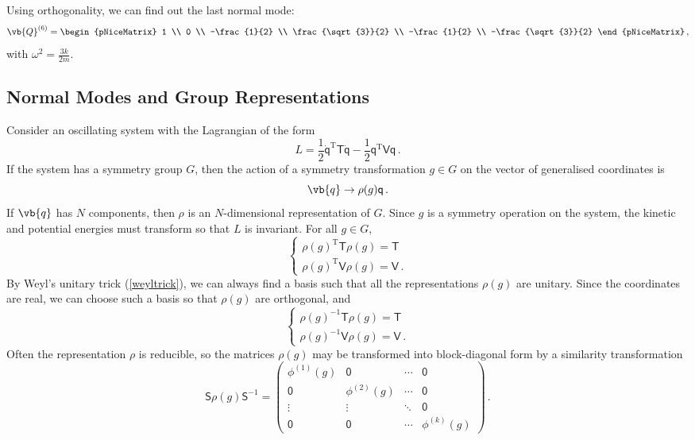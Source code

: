\documentclass{article}
\theoremstyle{plain}\theoremheaderfont{\normalfont\itshape}\theorembodyfont{\rmfamily}\theoremseparator{.}\newtheorem*{rem}{Remark}\newtheorem*{ex}{Example}\newtheorem*{proof}{Proof}\newtheorem*{altp}{Alternative proof}
\theoremstyle{plain}\theoremheaderfont{\normalfont\bfseries}\theorembodyfont{\rmfamily}\theoremseparator{.}\newtheorem{thm}{Theorem}[section]\newtheorem{lem}[thm]{Lemma}\newtheorem{prop}[thm]{Proposition}\newtheorem*{cor}{Corollary}\newtheorem{defn}[thm]{Definition}\newtheorem{clm}[thm]{Claim}\newtheorem{clminproof}{Claim}
\theoremstyle{break}\theoremheaderfont{\normalfont\itshape}\theorembodyfont{\rmfamily}\theoremseparator{.\medskip}\newtheorem*{proofskip}{Proof}\newtheorem*{exs}{Examples}\newtheorem*{rems}{Remarks}
\theoremstyle{break}\theoremheaderfont{\normalfont\bfseries}\theorembodyfont{\rmfamily}\theoremseparator{.\medskip}\newtheorem{lemskip}[thm]{Lemma}\newtheorem{defnskip}[thm]{Definition}\newtheorem{propskip}[thm]{Proposition}\newtheorem{thmskip}[thm]{Theorem}
\numberwithin{equation}{section}
\newcommand{\tp}{^\mathrm{T}}
\begin{document}
	Using orthogonality, we can find out the last normal mode:
	\[\vb{Q}^{(6)}=\begin{pNiceMatrix}
		1 \\ 0 \\ -\frac{1}{2} \\ \frac{\sqrt{3}}{2} \\ -\frac{1}{2} \\ -\frac{\sqrt{3}}{2}
	\end{pNiceMatrix}\,,\]
	with \(\omega^2=\frac{3k}{2m}\).
	\subsection{Normal Modes and Group Representations}
	Consider an oscillating system with the Lagrangian of the form
	\[L=\frac{1}{2}\dot{\mathsf{q}}\tp\mathsf{T}\dot{\mathsf{q}}-\frac{1}{2}\mathsf{q}\tp\mathsf{Vq}\,.\]
	If the system has a symmetry group \(G\), then the action of a symmetry transformation \(g\in G\) on the vector of generalised coordinates is
	\[\vb{q}\to\rho(g)\mathsf{q}\,.\]
	If \(\vb{q}\) has \(N\) components, then \(\rho\) is an \(N\)-dimensional representation of \(G\). Since \(g\) is a symmetry operation on the system, the kinetic and potential energies must transform so that \(L\) is invariant. For all \(g\in G\),
	\[\begin{cases}
		\rho(g)\tp\mathsf{T}\rho(g)=\mathsf{T}\\
		\rho(g)\tp\mathsf{V}\rho(g)=\mathsf{V}\,.
	\end{cases}\]
	By Weyl's unitary trick (\cref{weyltrick}), we can always find a basis such that all the representations \(\rho(g)\) are unitary. Since the coordinates are real, we can choose such a basis so that \(\rho(g)\) are orthogonal, and
	\begin{equation}\tag{\(\dagger\)}
		\begin{cases}
			\rho(g)^{-1}\mathsf{T}\rho(g)=\mathsf{T}\\
			\rho(g)^{-1}\mathsf{V}\rho(g)=\mathsf{V}\,.
		\end{cases}
	\end{equation}
	Often the representation \(\rho\) is reducible, so the matrices \(\rho(g)\) may be transformed into block-diagonal form by a similarity transformation
	\[\mathsf{S}\rho(g)\mathsf{S}^{-1}=\begin{pmatrix}
		\phi^{(1)}(g) & \mathsf{0} & \cdots & \mathsf{0}\\
		\mathsf{0} & \phi^{(2)}(g) & \cdots & \mathsf{0}\\
		\vdots & \vdots & \ddots & \mathsf{0}\\
		\mathsf{0} & \mathsf{0} & \cdots & \phi^{(k)}(g)
	\end{pmatrix}\,.\]
\end{document}
